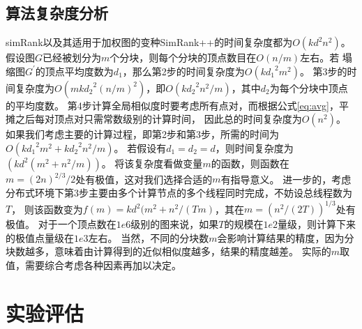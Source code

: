 \documentclass[master]{njuthesis}
\begin{document}
\subsection{算法复杂度分析}
simRank以及其适用于加权图的变种SimRank++的时间复杂度都为$O(kd^2n^2)$。
假设图$G$已经被划分为$m$个分块，则每个分块的顶点数目在$O(n/m)$左右。若
塌缩图$G^\prime$的顶点平均度数为$d_1$，那么第2步的时间复杂度为$O(k{d_1}^2m^2)$。
第3步的时间复杂度为$O(mk{d_2}^2(n/m)^2)$，即$O(k{d_2}^2n^2/m)$，其中$d_2$为每个分块中顶点的平均度数。
第4步计算全局相似度时要考虑所有点对，而根据公式\ref{eq:avg}，平摊之后每对顶点对只需常数级别的计算时间，
因此总的时间复杂度为$O(n^2)$。
如果我们考虑主要的计算过程，即第2步和第3步，所需的时间为$O(k{d_1}^2m^2+k{d_2}^2n^2/m)$。
若假设有$d_1=d_2=d$，则时间复杂度为$(kd^2(m^2+n^2/m))$。 
将该复杂度看做变量$m$的函数，则函数在$m=(2n)^{2/3}/2$处有极值，这对我们选择合适的$m$有指导意义。
进一步的，考虑分布式环境下第3步主要由多个计算节点的多个线程同时完成，不妨设总线程数为$T$，
则该函数变为$f(m)=kd^2(m^2+n^2/(Tm)$，其在$m=(n^2/(2T))^{1/3}$处有极值。
对于一个顶点数在$1e6$级别的图来说，如果$T$的规模在$1e2$量级，则计算下来的极值点量级在$1e3$左右。
当然，不同的分块数$m$会影响计算结果的精度，因为分块数越多，意味着由计算得到的近似相似度越多，结果的精度越差。
实际的$m$取值，需要综合考虑各种因素再加以决定。

\section{实验评估}
\end{document}
